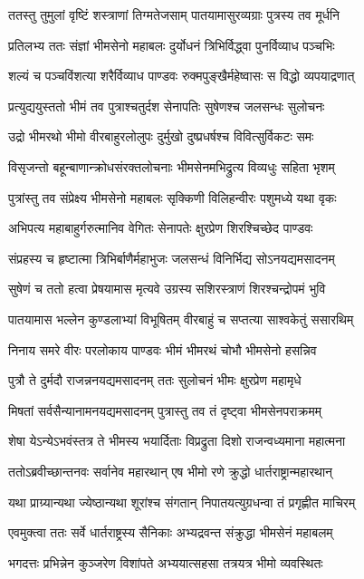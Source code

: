 \twolineshloka
{ततस्तु तुमुलां वृष्टिं शस्त्राणां तिग्मतेजसाम्}
{पातयामासुरव्यग्राः पुत्रस्य तव मूर्धनि}


\twolineshloka
{प्रतिलभ्य ततः संज्ञां भीमसेनो महाबलः}
{दुर्योधनं त्रिभिर्विद्ध्वा पुनर्विव्याध पञ्चभिः}


\twolineshloka
{शल्यं च पञ्चविंशत्या शरैर्विव्याध पाण्डवः}
{रुक्मपुङ्खैर्महेष्वासः स विद्धो व्यपयाद्रणात्}


\twolineshloka
{प्रत्युद्ययुस्ततो भीमं तव पुत्राश्चतुर्दश}
{सेनापतिः सुषेणश्च जलसन्धः सुलोचनः}


\twolineshloka
{उद्रो भीमरथो भीमो वीरबाहुरलोलुपः}
{दुर्मुखो दुष्प्रधर्षश्च विवित्सुर्विकटः समः}


\twolineshloka
{विसृजन्तो बहून्बाणान्क्रोधसंरक्तलोचनाः}
{भीमसेनमभिद्रुत्य विव्यधुः सहिता भृशम्}


\twolineshloka
{पुत्रांस्तु तव संप्रेक्ष्य भीमसेनो महाबलः}
{सृक्किणी विलिहन्वीरः पशुमध्ये यथा वृकः}


\twolineshloka
{अभिपत्य महाबाहुर्गरुत्मानिव वेगितः}
{सेनापतेः क्षुरप्रेण शिरश्चिच्छेद पाण्डवः}


\twolineshloka
{संप्रहस्य च हृष्टात्मा त्रिभिर्बाणैर्महाभुजः}
{जलसन्धं विनिर्भिद्य सोऽनयद्यमसादनम्}


\twolineshloka
{सुषेणं च ततो हत्वा प्रेषयामास मृत्यवे}
{उग्रस्य सशिरस्त्राणं शिरश्चन्द्रोपमं भुवि}


\twolineshloka
{पातयामास भल्लेन कुण्डलाभ्यां विभूषितम्}
{वीरबाहुं च सप्तत्या साश्वकेतुं ससारथिम्}


\twolineshloka
{निनाय समरे वीरः परलोकाय पाण्डवः}
{भीमं भीमरथं चोभौ भीमसेनो हसन्निव}


\twolineshloka
{पुत्रौ ते दुर्मदौ राजन्ननयद्यमसादनम्}
{ततः सुलोचनं भीमः क्षुरप्रेण महामृधे}


\twolineshloka
{मिषतां सर्वसैन्यानामनयद्यमसादनम्}
{पुत्रास्तु तव तं दृष्ट्वा भीमसेनपराक्रमम्}


\twolineshloka
{शेषा येऽन्येऽभवंस्तत्र ते भीमस्य भयार्दिताः}
{विप्रद्रुता दिशो राजन्वध्यमाना महात्मना}


\twolineshloka
{ततोऽब्रवीच्छान्तनवः सर्वानेव महारथान्}
{एष भीमो रणे क्रुद्धो धार्तराष्ट्रान्महारथान्}


\twolineshloka
{यथा प्राग्र्यान्यथा ज्येष्ठान्यथा शूरांश्च संगतान्}
{निपातयत्युग्रधन्वा तं प्रगृह्णीत माचिरम्}


\twolineshloka
{एवमुक्त्वा ततः सर्वे धार्तराष्ट्रस्य सैनिकाः}
{अभ्यद्रवन्त संक्रुद्धा भीमसेनं महाबलम्}


\twolineshloka
{भगदत्तः प्रभिन्नेन कुञ्जरेण विशांपते}
{अभ्ययात्सहसा तत्रयत्र भीमो व्यवस्थितः}


